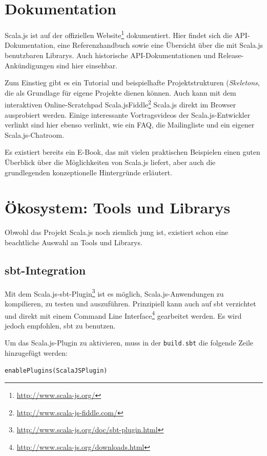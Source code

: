 \documentclass[a4paper, 12pt, hidelinks, listof=totoc, listoftables=totoc, bibliography=totoc]{scrreprt}
\newcommand{\code}[1]{\lstinline[language=Scala, style=inline]|#1|}
\begin{document}
\section{Dokumentation}

Scala.js ist auf der offiziellen Website\footnote{\url{http://www.scala-js.org/}} dokumentiert. Hier findet sich die \ac{API}-Dokumentation, eine Referenzhandbuch sowie eine Übersicht über die mit Scala.js benutzbaren Librarys. Auch historische \ac{API}-Dokumentationen und  Release-Ankündigungen sind hier einsehbar.

Zum Einstieg gibt es ein Tutorial und beispielhafte Projektstrukturen (\emph{Skeletons}, die als Grundlage für eigene Projekte dienen können. Auch kann mit dem interaktiven Online-Scratchpad Scala.jsFiddle\footnote{\url{http://www.scala-js-fiddle.com/}} Scala.js direkt im Browser ausprobiert werden. Einige interessante Vortragsvideos der Scala.js-Entwickler verlinkt sind hier ebenso verlinkt, wie ein FAQ, die Mailingliste und ein eigener Scala.js-Chatroom.

Es existiert bereits ein E-Book, das mit vielen praktischen Beispielen einen guten Überblick über die Möglichkeiten von Scala.js liefert, aber auch die grundlegenden konzeptionelle Hintergründe erläutert. \cite{haoyi.HOS}


\section{Ökosystem: Tools und Librarys}\label{sec:sjs-libs}

Obwohl das Projekt Scala.js noch ziemlich jung ist, existiert schon eine beachtliche Auswahl an Tools und Librarys. 


\subsection{sbt-Integration}\label{subsec:sjs-sbt}

Mit dem Scala.js-sbt-Plugin\footnote{\url{http://www.scala-js.org/doc/sbt-plugin.html}} ist es möglich, Scala.js-Anwendungen zu kompilieren, zu testen und auszuführen.
Prinzipiell kann auch auf sbt verzichtet und direkt mit einem Command Line Interface\footnote{\url{http://www.scala-js.org/downloads.html}} gearbeitet werden. Es wird jedoch empfohlen, sbt zu benutzen.

Um das Scala.js-Plugin zu aktivieren, muss in der \code{build.sbt} die folgende Zeile hinzugefügt werden:

\begin{lstlisting}[style=snippet]
enablePlugins(ScalaJSPlugin)
\end{lstlisting}
\end{document}
